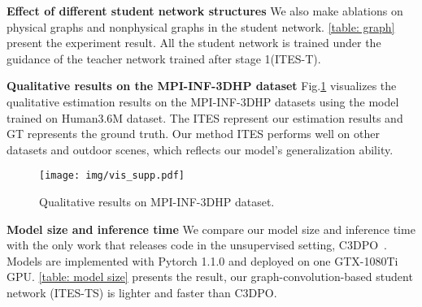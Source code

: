 \documentclass[letterpaper]{article} \usepackage{aaai21}  \usepackage{times}  \usepackage{helvet} \usepackage{courier}  \usepackage[hyphens]{url}  \usepackage{graphicx} \urlstyle{rm} \def\UrlFont{\rm}  \usepackage{natbib}  \usepackage{caption} \frenchspacing  \setlength{\pdfpagewidth}{8.5in}  \setlength{\pdfpageheight}{11in}
\begin{document}
\begin{table}[!h]
\begin{center}
\end{center}
\vspace{-3mm}
\end{table}

\textbf{Effect of different student network structures}
We also make ablations on physical graphs and nonphysical graphs in the student network. \ref{table: graph} present the experiment result. All the student network is trained under the guidance of the teacher network trained after stage 1(ITES-T). 

\textbf{Qualitative results on the MPI-INF-3DHP dataset} Fig.\ref{fig:vis} visualizes the qualitative estimation results on the MPI-INF-3DHP datasets using the model trained on Human3.6M dataset. The ITES represent our estimation results and GT represents the ground truth. Our method ITES performs well on other datasets and outdoor scenes, which reflects our model's generalization ability.

\begin{figure}[!t] 
\centering
\texttt{[image: img/vis\_supp.pdf]}
\vspace{-3mm}
\caption{\small Qualitative results on MPI-INF-3DHP dataset. } 
\label{fig:vis}
\vspace{-3mm}
\end{figure}

\textbf{Model size and inference time}
We compare our model size and inference time with the only work that releases code in the unsupervised setting, C3DPO~\cite{novotny2019c3dpo}. 
Models are implemented with Pytorch 1.1.0 and deployed on one GTX-1080Ti GPU. \ref{table: model size} presents the result, our graph-convolution-based student network (ITES-TS) is lighter and faster than C3DPO.
\end{document}
